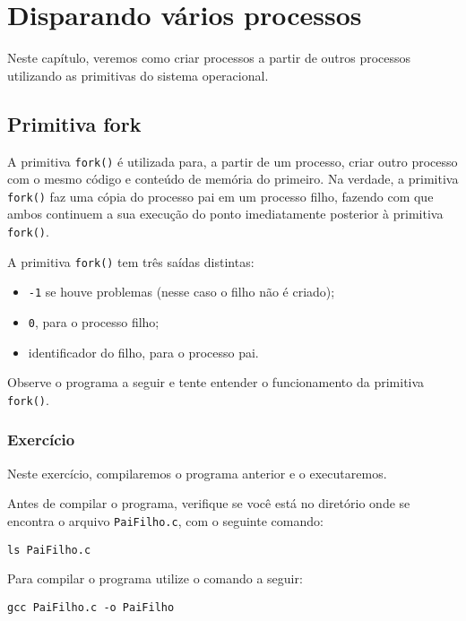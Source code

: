 \chapter{Disparando vários processos}
Neste capítulo, veremos como criar processos a partir de outros processos utilizando as primitivas do sistema operacional.

\section{Primitiva fork}
A primitiva \texttt{fork()} é utilizada para, a partir de um processo, criar outro processo com o mesmo código e conteúdo de memória do primeiro. Na verdade, a primitiva \texttt{fork()} faz uma cópia do processo pai em um processo filho, fazendo com que ambos continuem a sua execução do ponto imediatamente posterior à  primitiva \texttt{fork()}.

A primitiva \texttt{fork()} tem três saídas distintas:
\begin{itemize}
\setlength{\itemsep}{1pt}\setlength{\parskip}{0pt}  \setlength{\parsep}{0pt}
\item \texttt{-1} se houve problemas (nesse caso o filho não é criado);
\item \texttt{0}, para o processo filho;
\item identificador do filho, para o processo pai.
\end{itemize}

Observe o programa a seguir e tente entender o funcionamento da primitiva \texttt{fork()}.



\subsection{Exercício}
Neste exercício, compilaremos o programa anterior e o executaremos.

Antes de compilar o programa, verifique se você está no diretório onde se encontra o arquivo  \texttt{PaiFilho.c}, com o seguinte comando:

\begin{lstlisting}[style=MyBashStyle]
ls PaiFilho.c
\end{lstlisting}

Para compilar o programa utilize o comando a seguir:
\begin{lstlisting}[style=MyBashStyle]
gcc PaiFilho.c -o PaiFilho
\end{lstlisting}

